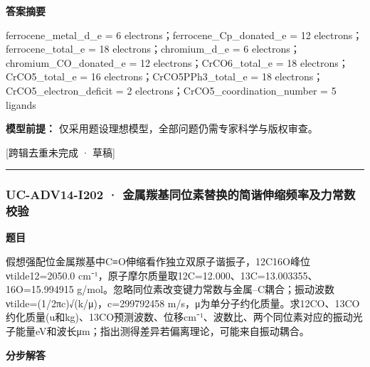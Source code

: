 \documentclass[UTF8,11pt,a4paper]{ctexart}
\begin{document}
\noindent\textbf{答案摘要}\par
ferrocene\_metal\_d\_e = 6 electrons；ferrocene\_Cp\_donated\_e = 12 electrons；ferrocene\_total\_e = 18 electrons；chromium\_d\_e = 6 electrons；chromium\_CO\_donated\_e = 12 electrons；CrCO6\_total\_e = 18 electrons；CrCO5\_total\_e = 16 electrons；CrCO5PPh3\_total\_e = 18 electrons；CrCO5\_electron\_deficit = 2 electrons；CrCO5\_coordination\_number = 5 ligands\par
\noindent\textbf{模型前提：}
仅采用题设理想模型，全部问题仍需专家科学与版权审查。\par
\noindent\textcolor{red!65!black}{[跨辑去重未完成 · 草稿]} \par
\medskip\hrule\medskip
{}
\subsubsection*{UC-ADV14-I202 · 金属羰基同位素替换的简谐伸缩频率及力常数校验}
\noindent\textbf{题目}\par
假想强配位金属羰基中C≡O伸缩看作独立双原子谐振子，12C16O峰位νtilde12=2050.0 cm⁻¹，原子摩尔质量取12C=12.000、13C=13.003355、16O=15.994915 g/mol。忽略同位素改变键力常数与金属–C耦合；振动波数νtilde=(1/2πc)√(k/μ)，c=299792458 m/s，μ为单分子约化质量。求12CO、13CO约化质量(u和kg)、13CO预测波数、位移cm⁻¹、波数比、两个同位素对应的振动光子能量eV和波长μm；指出测得差异若偏离理论，可能来自振动耦合。\par
\medskip\noindent\textbf{分步解答}
\end{document}
